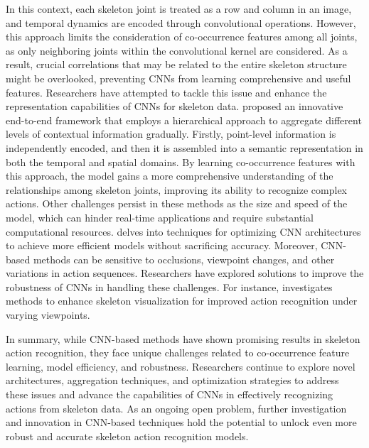  In this context, each skeleton joint is treated as a row and column in an image, and temporal dynamics are encoded through convolutional operations. However, this approach limits the consideration of co-occurrence features among all joints, as only neighboring joints within the convolutional kernel are considered. As a result, crucial correlations that may be related to the entire skeleton structure might be overlooked, preventing CNNs from learning comprehensive and useful features. Researchers have attempted to tackle this issue and enhance the representation capabilities of CNNs for skeleton data. \cite{li2018co} proposed an innovative end-to-end framework that employs a hierarchical approach to aggregate different levels of contextual information gradually. Firstly, point-level information is independently encoded, and then it is assembled into a semantic representation in both the temporal and spatial domains. By learning co-occurrence features with this approach, the model gains a more comprehensive understanding of the relationships among skeleton joints, improving its ability to recognize complex actions. Other challenges persist in these methods as the size and speed of the model, which can hinder real-time applications and require substantial computational resources. \cite{yang2019make} delves into techniques for optimizing CNN architectures to achieve more efficient models without sacrificing accuracy. Moreover, CNN-based methods can be sensitive to occlusions, viewpoint changes, and other variations in action sequences. Researchers have explored solutions to improve the robustness of CNNs in handling these challenges. For instance, \cite{liu2017enhanced} investigates methods to enhance skeleton visualization for improved action recognition under varying viewpoints.

 In summary, while CNN-based methods have shown promising results in skeleton action recognition, they face unique challenges related to co-occurrence feature learning, model efficiency, and robustness. Researchers continue to explore novel architectures, aggregation techniques, and optimization strategies to address these issues and advance the capabilities of CNNs in effectively recognizing actions from skeleton data. As an ongoing open problem, further investigation and innovation in CNN-based techniques hold the potential to unlock even more robust and accurate skeleton action recognition models.
 
